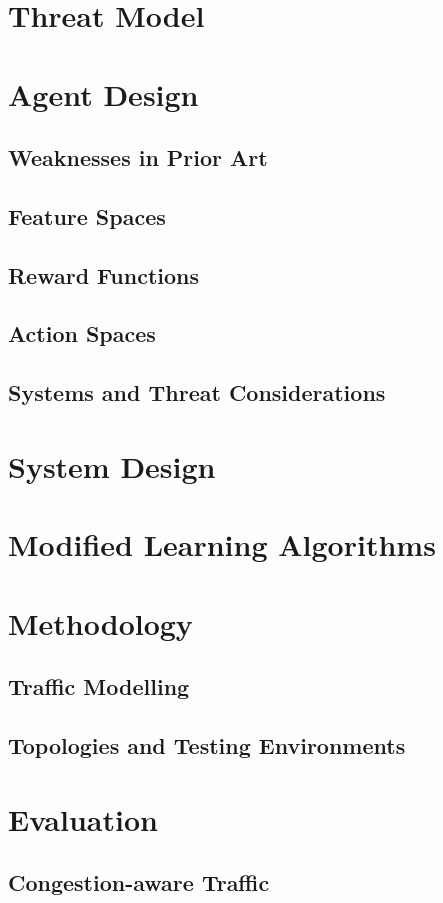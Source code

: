 \documentclass[twoside,hidelinks]{glasgowthesis}
\begin{document}
\section{Threat Model}
\section{Agent Design}
\subsection{Weaknesses in Prior Art}
\subsection{Feature Spaces}
\subsection{Reward Functions}
\subsection{Action Spaces}
\subsection{Systems and Threat Considerations}
\section{System Design}
\section{Modified Learning Algorithms}
\section{Methodology}
\subsection{Traffic Modelling}
\subsection{Topologies and Testing Environments}
\section{Evaluation}
\subsection{Congestion-aware Traffic}
\end{document}
